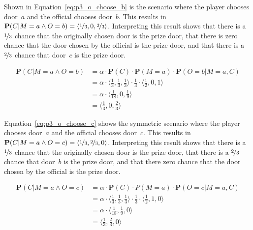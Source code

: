 \begin{sloppypar}
Shown in Equation~\ref{eq:p3_o_choose_b} is the scenario where the player chooses door~$a$ and the official chooses door~$b$. This results in $\textbf{P}(C \vert M=a \land O=b) = \langle \nicefrac{1}{3}, 0, \nicefrac{2}{3} \rangle$. Interpreting this result shows that there is a $\nicefrac{1}{3}$ chance that the originally chosen door is the prize door, that there is zero chance that the door chosen by the official is the prize door, and that there is a $\nicefrac{2}{3}$ chance that door~$c$ is the prize door.
\end{sloppypar}

\begin{equation}
\begin{split}
\textbf{P}(C \vert M=a \land O=b)
&= \alpha \cdot \textbf{P}(C) \cdot \textbf{P}(M=a) \cdot \textbf{P}(O=b \vert M=a, C) \\
&= \alpha \cdot \langle \frac{1}{3}, \frac{1}{3}, \frac{1}{3} \rangle \cdot \frac{1}{3} \cdot \langle \frac{1}{2}, 0, 1 \rangle \\
&= \alpha \cdot \langle \frac{1}{18}, 0, \frac{1}{9} \rangle \\
&= \langle \frac{1}{3}, 0, \frac{2}{3} \rangle
\end{split}
\label{eq:p3_o_choose_b}
\end{equation}

Equation~\ref{eq:p3_o_choose_c} shows the symmetric scenario where the player chooses door~$a$ and the official chooses door~$c$. This results in $\textbf{P}(C \vert M=a \land O=c) = \langle \nicefrac{1}{3}, \nicefrac{2}{3}, 0 \rangle$. Interpreting this result shows that there is a $\nicefrac{1}{3}$ chance that the originally chosen door is the prize door, that there is a $\nicefrac{2}{3}$ chance that door~$b$ is the prize door, and that there zero chance that the door chosen by the official is the prize door.

\begin{equation}
\begin{split}
\textbf{P}(C \vert M=a \land O=c)
&= \alpha \cdot \textbf{P}(C) \cdot P(M=a) \cdot \textbf{P}(O=c \vert M=a, C) \\
&= \alpha \cdot \langle \frac{1}{3}, \frac{1}{3}, \frac{1}{3} \rangle \cdot \frac{1}{3} \cdot \langle \frac{1}{2}, 1, 0 \rangle \\
&= \alpha \cdot \langle \frac{1}{18}, \frac{1}{9}, 0 \rangle \\
&= \langle \frac{1}{3}, \frac{2}{3}, 0 \rangle
\end{split}
\label{eq:p3_o_choose_c}
\end{equation}

